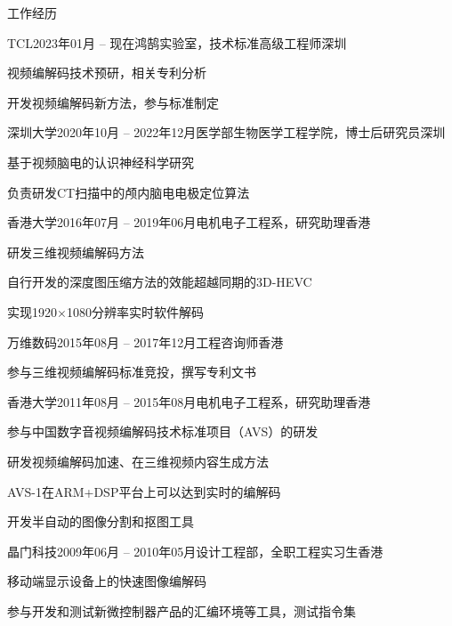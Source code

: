 \documentclass{resume} %
\begin{document}
\begin{rSection}{工作经历}
    \begin{rSubsection}{TCL}{2023年01月 -- 现在}{鸿鹄实验室，技术标准高级工程师}{深圳}
        \item 视频编解码技术预研，相关专利分析
		\item 开发视频编解码新方法，参与标准制定
    \end{rSubsection}

    \begin{rSubsection}{深圳大学}{2020年10月 -- 2022年12月}{医学部生物医学工程学院，博士后研究员}{深圳}
        \item 基于视频脑电的认识神经科学研究
        \item 负责研发CT扫描中的颅内脑电电极定位算法
    \end{rSubsection}

	\begin{rSubsection}{香港大学}{2016年07月 -- 2019年06月}{电机电子工程系，研究助理}{香港}
	\item 研发三维视频编解码方法
	\item 自行开发的深度图压缩方法的效能超越同期的3D-HEVC
	\item 实现1920$\times$1080分辨率实时软件解码
	\end{rSubsection}

    \begin{rSubsection}{万维数码}{2015年08月 -- 2017年12月}{工程咨询师}{香港}
        \item 参与三维视频编解码标准竞投，撰写专利文书
    \end{rSubsection}

    \begin{rSubsection}{香港大学}{2011年08月 -- 2015年08月}{电机电子工程系，研究助理}{香港}
        \item 参与中国数字音视频编解码技术标准项目（AVS）的研发
        \item 研发视频编解码加速、在三维视频内容生成方法
        \item AVS-1在ARM+DSP平台上可以达到实时的编解码
        \item 开发半自动的图像分割和抠图工具
    \end{rSubsection}

    \begin{rSubsection}{晶门科技}{2009年06月 -- 2010年05月}{设计工程部，全职工程实习生}{香港}
        \item 移动端显示设备上的快速图像编解码
        \item 参与开发和测试新微控制器产品的汇编环境等工具，测试指令集
    \end{rSubsection}
\end{rSection}
\end{document}
